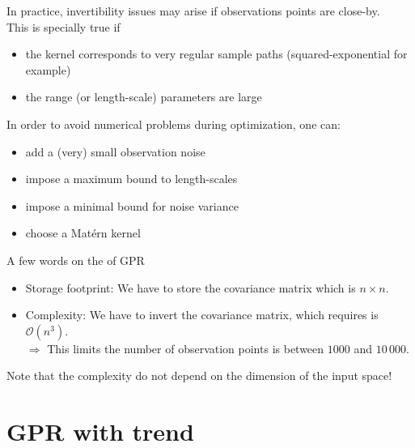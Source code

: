 \documentclass{beamer}
\begin{document}
\begin{frame}{}
In practice, invertibility issues may arise if observations points are close-by. \\
\vspace{3mm}
This is specially true if
\begin{itemize}
	\item the kernel corresponds to very regular sample paths (squared-exponential for example)
	\item the range (or length-scale) parameters are large
\end{itemize}
\vspace{3mm}
In order to avoid numerical problems during optimization, one can:
\begin{itemize}
	\item add a (very) small observation noise\\
	\item impose a maximum bound to length-scales
	\item impose a minimal bound for noise variance 
	\item choose a Mat\'ern kernel
\end{itemize}
\end{frame}

\begin{frame}{}
A few words on the  of GPR\\ \vspace{2mm}
	\begin{itemize}
  		\item \alert{Storage footprint:} We have to store the covariance matrix which is $n \times n$.
  		\item \alert{Complexity:} We have to invert the covariance matrix, which requires is $\mathcal{O}(n^3)$.\\
  		$\Rightarrow$ This limits the number of observation points is between $1000$ and $10\,000$. \vspace{2mm}
	\end{itemize}
Note that the complexity do not depend on the dimension of the input space!
\end{frame}

\section{GPR with trend}
\end{document}
